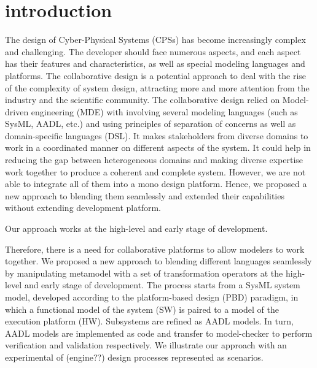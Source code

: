 \section{introduction}
The design of Cyber-Physical Systems (CPSs) has become increasingly complex and challenging. The developer should face numerous aspects, and each aspect has their features and characteristics, as well as special modeling languages and platforms. The collaborative design is a potential approach to deal with the rise of the complexity of system design, attracting more and more attention from the industry and the scientific community. The collaborative design relied on Model-driven engineering (MDE) with involving several modeling languages (such as SysML, AADL, etc.) and using principles of separation of concerns as well as domain-specific languages (DSL). It makes stakeholders from diverse domains to work in a coordinated manner on different aspects of the system. It could help in reducing the gap between heterogeneous domains and making diverse expertise work together to produce a coherent and complete system. However, we are not able to integrate all of them into a mono design platform. Hence, we proposed a new approach to blending them seamlessly and extended their capabilities without extending development platform. 


Our approach works at the high-level and early stage of development. 


Therefore, there is a need for collaborative platforms to allow modelers to work together. We proposed a new approach to blending different languages seamlessly by manipulating metamodel with a set of transformation operators at the high-level and early stage of development. The process starts from a SysML system model, developed according to the platform-based design (PBD) paradigm, in which a functional model of the system (SW) is paired to a model of the execution platform (HW). Subsystems are refined as AADL models. In turn, AADL models are implemented as code and transfer to model-checker to perform verification and validation respectively. We illustrate our approach with an experimental of (engine??) design processes represented as scenarios.





